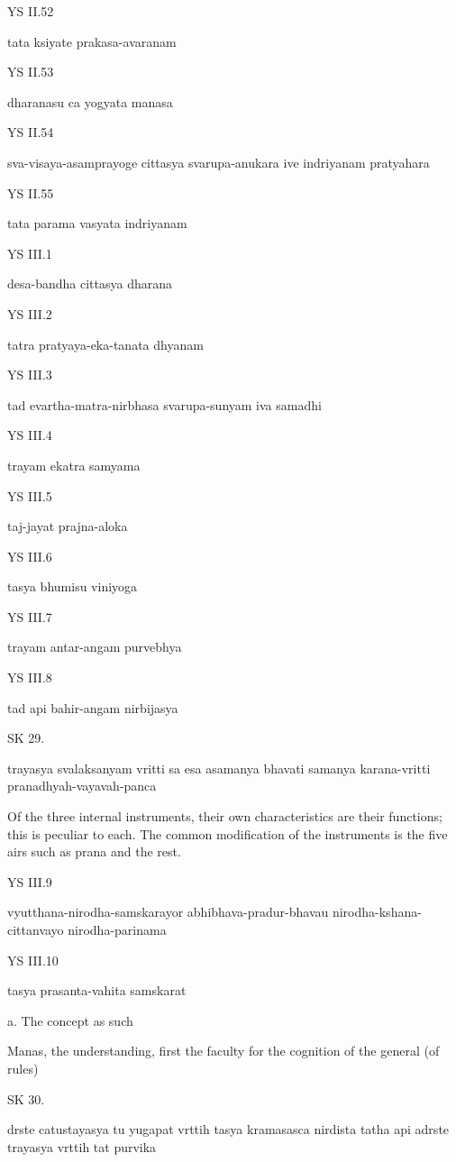 YS II.52

    tata ksiyate prakasa-avaranam

YS II.53

    dharanasu ca yogyata manasa

YS II.54

    sva-visaya-asamprayoge cittasya svarupa-anukara ive indriyanam pratyahara

YS II.55

    tata parama vasyata indriyanam

YS III.1

    desa-bandha cittasya dharana

YS III.2

    tatra pratyaya-eka-tanata dhyanam

YS III.3

    tad evartha-matra-nirbhasa svarupa-sunyam iva samadhi

YS III.4

    trayam ekatra samyama

YS III.5

    taj-jayat prajna-aloka

YS III.6

    tasya bhumisu viniyoga

YS III.7

    trayam antar-angam purvebhya

YS III.8

    tad api bahir-angam nirbijasya

SK 29.

trayasya svalaksanyam vritti sa esa asamanya bhavati
samanya karana-vritti pranadhyah-vayavah-panca

Of the three internal instruments, their own characteristics are their functions;
this is peculiar to each.
The common modification of the instruments is the five airs
such as prana and the rest.

YS III.9

    vyutthana-nirodha-samskarayor abhibhava-pradur-bhavau nirodha-kshana-cittanvayo nirodha-parinama

YS III.10

    tasya prasanta-vahita samskarat

    a. The concept as such

    Manas, the understanding, first the faculty for the cognition of the general (of rules)

SK 30.

drste catustayasya tu yugapat vrttih tasya kramasasca nirdista
tatha api adrste trayasya vrttih tat purvika

